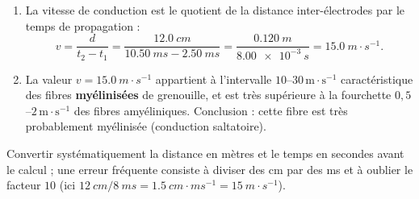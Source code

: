 \documentclass[11pt]{article}
\newcommand{\cle}[1]{{\popxbold\color{popdark}#1}}
\begin{document}
\begin{corrige}
\begin{enumerate}
    \item La vitesse de conduction est le quotient de la distance inter-électrodes par le temps de propagation :
    \[ v = \frac{d}{t_2 - t_1} = \frac{\SI{12,0}{cm}}{\SI{10,50}{ms} - \SI{2,50}{ms}} = \frac{\SI{0,120}{m}}{\SI{8,00e-3}{s}} = \SI{15,0}{m\cdot s^{-1}}. \]
    \item La valeur $v = \SI{15,0}{m\cdot s^{-1}}$ appartient à l'intervalle $10$--$30\,\text{m}\cdot\text{s}^{-1}$ caractéristique des fibres \textbf{myélinisées} de grenouille, et est très supérieure à la fourchette $0,5$--$2\,\text{m}\cdot\text{s}^{-1}$ des fibres amyéliniques. Conclusion : cette fibre est très probablement \cle{myélinisée} (conduction saltatoire).
\end{enumerate}
\end{corrige}

\begin{attention}
Convertir systématiquement la distance en mètres et le temps en secondes avant le calcul ; une erreur fréquente consiste à diviser des cm par des ms et à oublier le facteur $10$ (ici $\SI{12}{cm}/\SI{8}{ms} = \SI{1,5}{cm\cdot ms^{-1}} = \SI{15}{m\cdot s^{-1}}$).
\end{attention}
\end{document}
